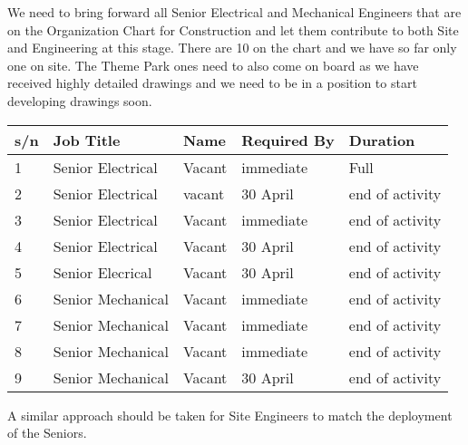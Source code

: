 We need to bring forward all Senior Electrical and Mechanical Engineers that are on the Organization Chart for Construction and let them contribute to both Site and Engineering at this stage. There are 10 on the chart and we have so far only one on site. The Theme Park ones need to also come on board as we have received highly
detailed drawings and we need to be in a position to start developing drawings soon.

\begin{longtable}{lll ll}
\toprule
s/n   &  Job Title                                                      & Name                       &Required By    &  Duration\\
\midrule
1     &  Senior Electrical                          & Vacant        			 & immediate    & Full  \\
2     &  Senior Electrical                          & vacant    			&  30 April  & end of activity  \\ 
3     &  Senior Electrical                          & Vacant                      &  immediate   & end of activity \\ 
4     &  Senior Electrical                          & Vacant                      & 30 April   & end of activity\\
5     &  Senior Elecrical                           & Vacant                      &  30 April  & end of activity\\
6     &  Senior Mechanical                       & Vacant                      &  immediate  & end of activity\\
7     &  Senior Mechanical                       & Vacant                      &   immediate & end of activity\\
8     &  Senior Mechanical                       & Vacant                      &  immediate  & end of activity\\
9     &  Senior Mechanical                       & Vacant                      &  30 April  & end of activity\\

\bottomrule
\end{longtable}

A similar approach should be taken for Site Engineers to match the deployment of the Seniors.


